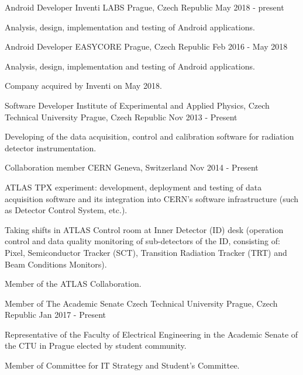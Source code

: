 \begin{cventries}
  \cventry
    {Android Developer}
    {Inventi LABS}
    {Prague, Czech Republic}
    {May 2018 - present}
    {
      \begin{cvitems}
      \item {Analysis, design, implementation and testing of Android applications.}
      \end{cvitems}
    }
  \cventry
    {Android Developer}
    {EASYCORE}
    {Prague, Czech Republic}
    {Feb 2016 - May 2018}
    {
      \begin{cvitems}
      \item {Analysis, design, implementation and testing of Android applications.}
      \item {Company acquired by Inventi on May 2018.}
      \end{cvitems}
    }
  \cventry
    {Software Developer}
    {Institute of Experimental and Applied Physics, Czech Technical University}
    {Prague, Czech Republic}
    {Nov 2013 - Present}
    {
      \begin{cvitems}
      \item {Developing of the data acquisition, control and calibration software for radiation detector instrumentation.}
      \end{cvitems}
    }
  \cventry
    {Collaboration member}
    {CERN}
    {Geneva, Switzerland}
    {Nov 2014 - Present}
    {
      \begin{cvitems}
      \item {ATLAS TPX experiment: development, deployment and testing of data acquisition software and its integration into CERN's software infrastructure (such as Detector Control System, etc.).}
      \item{Taking shifts in ATLAS Control room at Inner Detector (ID) desk (operation control and data quality monitoring of sub-detectors of the ID, consisting of: Pixel, Semiconductor Tracker (SCT), Transition Radiation Tracker (TRT) and Beam Conditions Monitors).}
      \item{Member of the ATLAS Collaboration.}
      \end{cvitems}
    }
  \cventry
    {Member of The Academic Senate}
    {Czech Technical University}
    {Prague, Czech Republic}
    {Jan 2017 - Present}
    {
      \begin{cvitems}
      \item {Representative of the Faculty of Electrical Engineering in the Academic Senate of the CTU in Prague elected by student community.}
      \item {Member of Committee for IT Strategy and Student's Committee.}
      \end{cvitems}
    }
    
    
\end{cventries}
